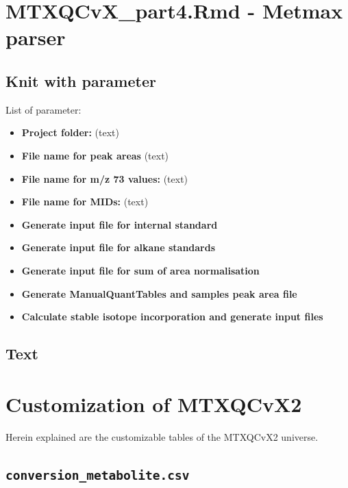 \documentclass[]{book}
\providecommand{\tightlist}{%
  \setlength{\itemsep}{0pt}\setlength{\parskip}{0pt}}
\theoremstyle{definition}
\theoremstyle{definition}
\theoremstyle{definition}
\theoremstyle{remark}
\begin{document}
\chapter{MTXQCvX\_part4.Rmd - Metmax parser}\label{Metmax}

\section{Knit with parameter}\label{knit-with-parameter-5}

List of parameter:

\begin{itemize}
\tightlist
\item
  \textbf{Project folder:} (text)
\item
  \textbf{File name for peak areas} (text)
\item
  \textbf{File name for m/z 73 values:} (text)
\item
  \textbf{File name for MIDs:} (text)
\item
  \textbf{Generate input file for internal standard}
\item
  \textbf{Generate input file for alkane standards}
\item
  \textbf{Generate input file for sum of area normalisation}
\item
  \textbf{Generate ManualQuantTables and samples peak area file}
\item
  \textbf{Calculate stable isotope incorporation and generate input
  files}
\end{itemize}

\section{Text}\label{text-3}

\chapter{Customization of MTXQCvX2}\label{config}

Herein explained are the customizable tables of the MTXQCvX2 universe.

\section{\texorpdfstring{\texttt{conversion\_metabolite.csv}}{conversion\_metabolite.csv}}\label{conversion_metabolite.csv}

\end{document}
